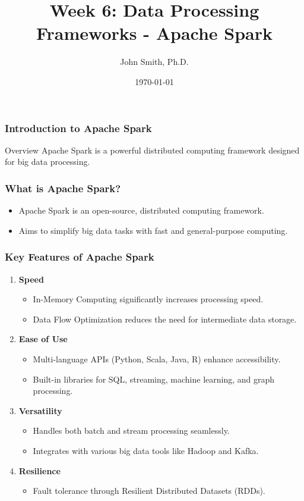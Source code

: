 \documentclass[aspectratio=169]{beamer}
\title[Week 6: Data Processing Frameworks]{Week 6: Data Processing Frameworks - Apache Spark}
\author[J. Smith]{John Smith, Ph.D.}
\institute[University Name]{
  Department of Computer Science\\
  University Name\\
  Email: email@university.edu
}
\date{\today}
\begin{document}
\frame{\titlepage}

\begin{frame}[fragile]
    \frametitle{Introduction to Apache Spark}
    \begin{block}{Overview}
        Apache Spark is a powerful distributed computing framework designed for big data processing.
    \end{block}
\end{frame}

\begin{frame}[fragile]
    \frametitle{What is Apache Spark?}
    \begin{itemize}
        \item Apache Spark is an open-source, distributed computing framework.
        \item Aims to simplify big data tasks with fast and general-purpose computing.
    \end{itemize}
\end{frame}

\begin{frame}[fragile]
    \frametitle{Key Features of Apache Spark}
    \begin{enumerate}
        \item \textbf{Speed}
            \begin{itemize}
                \item In-Memory Computing significantly increases processing speed.
                \item Data Flow Optimization reduces the need for intermediate data storage.
            \end{itemize}
        \item \textbf{Ease of Use}
            \begin{itemize}
                \item Multi-language APIs (Python, Scala, Java, R) enhance accessibility.
                \item Built-in libraries for SQL, streaming, machine learning, and graph processing.
            \end{itemize}
        \item \textbf{Versatility}
            \begin{itemize}
                \item Handles both batch and stream processing seamlessly.
                \item Integrates with various big data tools like Hadoop and Kafka.
            \end{itemize}
        \item \textbf{Resilience}
            \begin{itemize}
                \item Fault tolerance through Resilient Distributed Datasets (RDDs).
            \end{itemize}
    \end{enumerate}
\end{frame}
\end{document}
